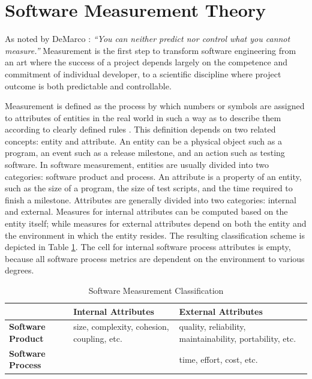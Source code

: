 
\section{Software Measurement Theory}  \label{RelatedWork:MeasurementOverview}

As noted by DeMarco \cite{DeMarco:1982}: \textit{``You can neither predict nor control what you cannot measure.''} Measurement is the first step to transform software engineering from an art where the success of a project depends largely on the competence and commitment of individual developer, to a scientific discipline where project outcome is both predictable and controllable.

Measurement is defined as the process by which numbers or symbols are assigned to attributes of entities in the real world in such a way as to describe them according to clearly defined rules \cite{Fenton:1997}. This definition depends on two related concepts: entity and attribute. 
An entity can be a physical object such as a program, an event such as a release milestone, and an action such as testing software. In software measurement, entities are usually divided into two categories: software product and process. 
An attribute is a property of an entity, such as the size of a program, the size of test scripts, and the time required to finish a milestone. Attributes are generally divided into two categories: internal and external. Measures for internal attributes can be computed based on the entity itself; while measures for external attributes depend on both the entity and the environment in which the entity resides. 
The resulting classification scheme is depicted in Table \ref{table:Software-Measurement-Classification}. The cell for internal software process attributes is empty, because all software process metrics are dependent on the environment to various degrees.

\begin{table}[tbp]
	\centering
		\caption{Software Measurement Classification}
		\begin{tabular}{|p{}|p{}|p{}|} 
			\hline
			{} & \textbf{Internal Attributes} & \textbf{External Attributes} \\
			\hline
			\textbf{Software Product} & size, complexity, cohesion, coupling, etc. & quality, reliability, maintainability, portability, etc. %
			\\
			\hline
			\textbf{Software Process} & {} & time, effort, cost, etc. \\
			\hline
		\end{tabular}
	\label{table:Software-Measurement-Classification}
\end{table}


